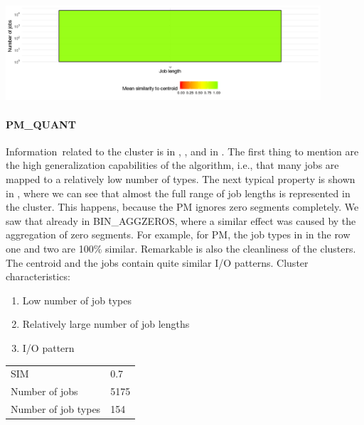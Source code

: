 \documentclass[]{llncs}
\begin{document}
\begingroup
  \centering
  \includegraphics[width=4.61in,height=1.39in]{./media/image8.png}
  \label{fig:hex_native:length}
\endgroup

\paragraph{PM\_QUANT}
Information\ related to the cluster is in , , and in .
The first thing to mention are the high generalization capabilities of the algorithm, i.e., that many jobs are mapped to a relatively low number of types.
The next typical property is shown in , where we can see that almost the full range of job lengths is represented in the cluster.
This happens, because the PM ignores zero segments completely.
We saw that already in BIN\_AGGZEROS, where a similar effect was caused by the aggregation of zero segments.
For example, for PM, the job types in  in the row one and two are 100$\%$  similar.
Remarkable is also the cleanliness of the clusters.
The centroid and the jobs contain quite similar I/O patterns.
Cluster characteristics:


\begin{enumerate}
 \item Low number of job types
 \item Relatively large number of job lengths
 \item I/O pattern
\end{enumerate}

\begingroup
  \centering
  \begin{tabular}{ll}
    SIM & 0.7 \\
    Number of jobs & 5175 \\
    Number of job types & 154 \\
  \end{tabular}
  \label{fig:pm_quant:stats}
\endgroup
\end{document}
